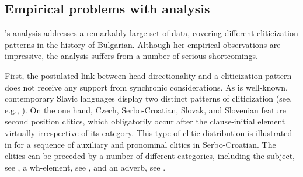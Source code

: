 \documentclass[output=paper,
modfonts,
newtxmath,
hidelinks
]{langscibook}
\begin{document}
\ea \label{ex5}
	 \label{ex5a}
	 \label{ex5b}
	\z
\z


\subsection{Empirical problems with  analysis}\label{s2.2}

\citeauthor{pancheva2005}’s analysis addresses a remarkably large set of data, covering different cliticization patterns in the history of Bulgarian. Although her empirical observations are impressive, the analysis suffers from a number of serious shortcomings. 

First, the postulated link between head directionality and a cliticization pattern does not receive any support from synchronic considerations. As is well-known, contemporary Slavic languages display two distinct patterns of cliticization (see, e.g., \citealt{Franks-King2000}). On the one hand, Czech, Serbo-Croatian, Slovak, and Slovenian feature second position clitics, which obligatorily occur after the clause-initial element virtually irrespective of its category. This type of clitic distribution is illustrated in  for a sequence of auxiliary and pronominal clitics in Serbo-Croatian. The clitics can be preceded by a number of different categories, including the subject, see , a wh-element, see , and an adverb, see . 
\end{document}
